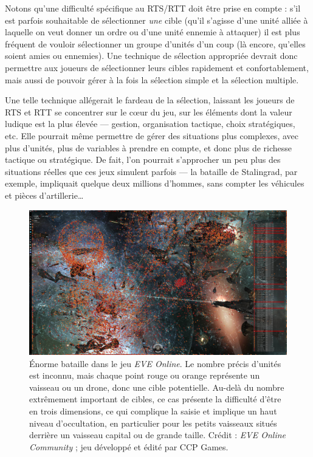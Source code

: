 	Notons qu'une difficulté spécifique au RTS/RTT doit être prise en compte : s'il est parfois souhaitable de sélectionner \emph{une} cible (qu'il s'agisse d'une unité alliée à laquelle on veut donner un ordre ou d'une unité ennemie à attaquer) il est plus fréquent de vouloir sélectionner un groupe d'unités d'un coup (là encore, qu'elles soient amies ou ennemies). Une technique de sélection appropriée devrait donc permettre aux joueurs de sélectionner leurs cibles rapidement et confortablement, mais aussi de pouvoir gérer à la fois la sélection simple et la sélection multiple.
	
	Une telle technique allégerait le fardeau de la sélection, laissant les joueurs de RTS et RTT se concentrer sur le cœur du jeu, sur les éléments dont la valeur ludique est la plus élevée --- gestion, organisation tactique, choix stratégiques, etc. Elle pourrait même permettre de gérer des situations plus complexes, avec plus d'unités, plus de variables à prendre en compte, et donc plus de richesse tactique ou stratégique. De fait, l'on pourrait s'approcher un peu plus des situations réelles que ces jeux simulent parfois --- la bataille de Stalingrad, par exemple, impliquait quelque deux millions d'hommes, sans compter les véhicules et pièces d'artillerie\ldots{}
	
	\begin{figure}[htb]
		\centering
		\includegraphics[width=\textwidth]{figures/ch1/eveonline}
		\caption[Énorme bataille dans le jeu \emph{EVE Online}]{Énorme bataille dans le jeu \emph{EVE Online}. Le nombre précis d'unités est inconnu, mais chaque point rouge ou orange représente un vaisseau ou un drone, donc une cible potentielle. Au-delà du nombre extrêmement important de cibles, ce cas présente la difficulté d'être en trois dimensions, ce qui complique la saisie et implique un haut niveau d'occultation, en particulier pour les petits vaisseaux situés derrière un vaisseau capital ou de grande taille. Crédit : \emph{EVE Online Community} ; jeu développé et édité par CCP Games.}
		\label{fig:eveonline}
	\end{figure}
	

